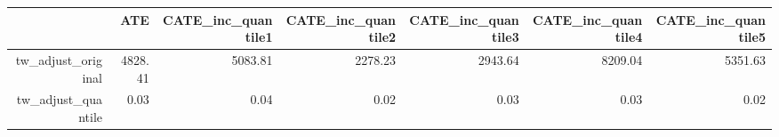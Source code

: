 \begin{table}[ht]
\centering
\begin{tabular}{rrrrrrr}
  \hline
 & ATE & CATE\_inc\_quantile1 & CATE\_inc\_quantile2 & CATE\_inc\_quantile3 & CATE\_inc\_quantile4 & CATE\_inc\_quantile5 \\ 
  \hline
tw\_adjust\_original & 4828.41 & 5083.81 & 2278.23 & 2943.64 & 8209.04 & 5351.63 \\ 
  tw\_adjust\_quantile & 0.03 & 0.04 & 0.02 & 0.03 & 0.03 & 0.02 \\ 
   \hline
\end{tabular}
\end{table}
